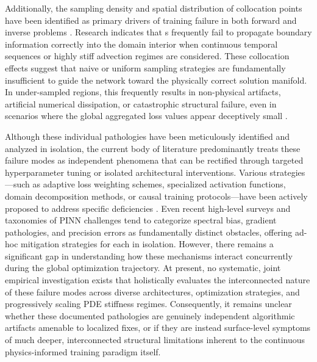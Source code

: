 Additionally, the sampling density and spatial distribution of collocation points have been identified as primary drivers of training failure in both forward and inverse problems \cite{Krishnapriyan2021}. Research indicates that \PINN{}s frequently fail to propagate boundary information correctly into the domain interior when continuous temporal sequences or highly stiff advection regimes are considered. These collocation effects suggest that naive or uniform sampling strategies are fundamentally insufficient to guide the network toward the physically correct solution manifold. In under-sampled regions, this frequently results in non-physical artifacts, artificial numerical dissipation, or catastrophic structural failure, even in scenarios where the global aggregated loss values appear deceptively small \cite{Krishnapriyan2021, Jagtap2020}.

Although these individual pathologies have been meticulously identified and analyzed in isolation, the current body of literature predominantly treats these failure modes as independent phenomena that can be rectified through targeted hyperparameter tuning or isolated architectural interventions. Various strategies—such as adaptive loss weighting schemes, specialized activation functions, domain decomposition methods, or causal training protocols—have been actively proposed to address specific deficiencies \cite{Wang2021gradpathology, Wang2022causal, Jagtap2020}. Even recent high-level surveys and taxonomies of PINN challenges tend to categorize spectral bias, gradient pathologies, and precision errors as fundamentally distinct obstacles, offering ad-hoc mitigation strategies for each in isolation. However, there remains a significant gap in understanding how these mechanisms interact concurrently during the global optimization trajectory. At present, no systematic, joint empirical investigation exists that holistically evaluates the interconnected nature of these failure modes across diverse architectures, optimization strategies, and progressively scaling PDE stiffness regimes. Consequently, it remains unclear whether these documented pathologies are genuinely independent algorithmic artifacts amenable to localized fixes, or if they are instead surface-level symptoms of much deeper, interconnected structural limitations inherent to the continuous physics-informed training paradigm itself.

